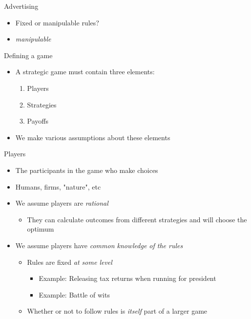 \documentclass[10pt]{beamer}
\begin{document}
\begin{frame}[label={sec:org71dddb6}]{}
\alert{Advertising}
\begin{itemize}
\item Fixed or manipulable rules?
\end{itemize}
\begin{itemize}
\item \emph{manipulable}
\end{itemize}
\end{frame}

\begin{frame}[label={sec:org0323301}]{}
\alert{Defining a game}
\begin{itemize}
\item A strategic game must contain three elements:
\begin{enumerate}
\item Players
\item Strategies
\item Payoffs
\end{enumerate}
\item We make various assumptions about these elements
\end{itemize}
\end{frame}

\begin{frame}[label={sec:org59abdbb}]{}
\alert{Players}
\begin{itemize}
\item The participants in the game who make choices
\item Humans, firms, "nature", etc
\item We assume players are \emph{rational}
\begin{itemize}
\item They can calculate outcomes from different strategies and will choose the optimum
\end{itemize}
\item We assume players have \emph{common knowledge of the rules}
\begin{itemize}
\item Rules are fixed \emph{at some level}
\begin{itemize}
\item Example: Releasing tax returns when running for president
\item Example: Battle of wits
\end{itemize}
\item Whether or not to follow rules is \emph{itself} part of a larger game
\end{itemize}
\end{itemize}
\end{frame}
\end{document}
